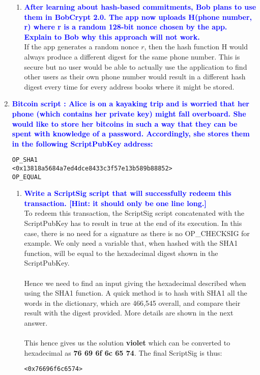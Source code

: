 \documentclass[11pt]{article}
\begin{document}
\begin{enumerate}
\begin{enumerate}
    \item \textbf{\textcolor{blue}{After learning about hash-based commitments, Bob plans to use them in BobCrypt 2.0. The app now uploads H(phone number, r) where r is a random 128-bit nonce chosen by the app. Explain to Bob why this approach will not work.}}
        \\ If the app generates a random nonce $r$, then the hash function H would always produce a different digest for the same phone number. This is secure but no user would be able to actually use the application to find other users as their own phone number would result in a different hash digest every time for every address books where it might be stored.
    \end{enumerate}
    
\item \textbf{\textcolor{blue}{Bitcoin script : Alice is on a kayaking trip and is worried that her phone (which contains her private key) might fall overboard. She would like to store her bitcoins in such a way that they can be spent with knowledge of a password. Accordingly, she stores them in the following ScriptPubKey address:}}
\begin{verbatim}
OP_SHA1
<0x13818a5684a7ed4dce8433c3f57e13b589b88852>
OP_EQUAL
\end{verbatim}

    \begin{enumerate}
    \item \textbf{\textcolor{blue}{Write a ScriptSig script that will successfully redeem this transaction. [Hint: it should only be one line long.]}}
        \\ To redeem this transaction, the ScriptSig script concatenated with the ScriptPubKey has to result in true at the end of its execution.
        In this case, there is no need for a signature as there is no OP\_CHECKSIG for example. We only need a variable that, when hashed with the SHA1 function, will be equal to the hexadecimal digest shown in the ScriptPubKey.
        \\\\ Hence we need to find an input giving the hexadecimal described when using the SHA1 function. A quick method is to hash with SHA1 all the words in the dictionary, which are 466,545 overall, and compare their result with the digest provided. More details are shown in the next answer.
        \\\\ This hence gives us the solution \textbf{violet} which can be converted to hexadecimal as \textbf{76 69 6f 6c 65 74}. The final ScriptSig is thus:
\begin{verbatim}
<0x76696f6c6574>
\end{verbatim}
        

\end{enumerate}
\end{enumerate}
\end{document}
